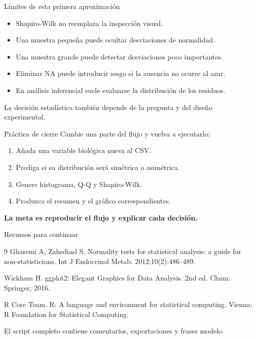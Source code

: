 \documentclass[aspectratio=169,11pt]{beamer}
\begin{document}
\begin{frame}{Límites de esta primera aproximación}
\begin{itemize}
  \item Shapiro-Wilk no reemplaza la inspección visual.
  \item Una muestra pequeña puede ocultar desviaciones de normalidad.
  \item Una muestra grande puede detectar desviaciones poco importantes.
  \item Eliminar NA puede introducir sesgo si la ausencia no ocurre al azar.
  \item En análisis inferencial suele evaluarse la distribución de los residuos.
\end{itemize}

\vspace{0.4cm}
\large La decisión estadística también depende de la pregunta y del diseño experimental.
\end{frame}

\begin{frame}{Práctica de cierre}
\large
Cambie una parte del flujo y vuelva a ejecutarlo:

\vspace{0.35cm}
\begin{enumerate}
  \item Añada una variable biológica nueva al CSV.
  \item Prediga si su distribución será simétrica o asimétrica.
  \item Genere histograma, Q-Q y Shapiro-Wilk.
  \item Produzca el resumen y el gráfico correspondientes.
\end{enumerate}

\vspace{0.5cm}
\centering
\textcolor{verde}{\Large\textbf{La meta es reproducir el flujo y explicar cada decisión.}}
\end{frame}

\begin{frame}{Recursos para continuar}
\small
\begin{thebibliography}{9}
Ghasemi A, Zahediasl S. Normality tests for statistical analysis: a guide for non-statisticians. Int J Endocrinol Metab. 2012;10(2):486--489.

Wickham H. ggplot2: Elegant Graphics for Data Analysis. 2nd ed. Cham: Springer; 2016.

R Core Team. R: A language and environment for statistical computing. Vienna: R Foundation for Statistical Computing.
\end{thebibliography}

\vfill
\centering
\textcolor{azul}{El script completo contiene comentarios, exportaciones y frases modelo.}
\end{frame}
\end{document}

